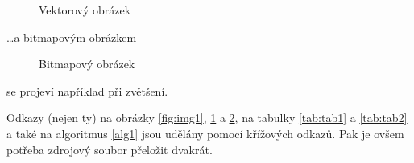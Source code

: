 \documentclass[11pt,a4paper]{article}
\begin{document}
\begin{figure}[h]
    \centering
    \caption{Vektorový obrázek}
    \label{fig:img2}
\end{figure}
\bigbreak
\noindent \dots a bitmapovým obrázkem
\begin{figure}[h]
    \centering
    \caption{Bitmapový obrázek}
    \label{fig:img3}
\end{figure}
\bigbreak
\noindent se projeví například při zvětšení.

Odkazy (nejen ty) na obrázky \ref{fig:img1}, \ref{fig:img2} a \ref{fig:img3}, na tabulky \ref{tab:tab1} a \ref{tab:tab2} a také na algoritmus \ref{alg1} jsou udělány pomocí křížových odkazů. Pak je ovšem potřeba zdrojový soubor přeložit dvakrát.
\end{document}
